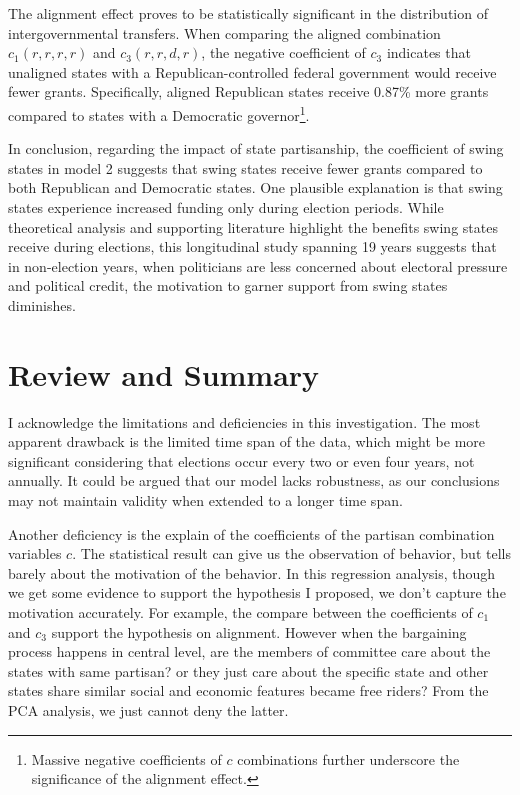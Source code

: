 \documentclass[man]{apa7}
\begin{document}

The alignment effect proves to be statistically significant in the distribution of intergovernmental transfers. When comparing the aligned combination $c_1(r, r, r, r)$ and $c_3(r, r, d, r)$, the negative coefficient of $c_3$ indicates that unaligned states with a Republican-controlled federal government would receive fewer grants. Specifically, aligned Republican states receive 0.87\% more grants compared to states with a Democratic governor\footnote{Massive negative coefficients of $c$ combinations further underscore the significance of the alignment effect.}.

In conclusion, regarding the impact of state partisanship, the coefficient of swing states in model 2 suggests that swing states receive fewer grants compared to both Republican and Democratic states. One plausible explanation is that swing states experience increased funding only during election periods. While theoretical analysis and supporting literature highlight the benefits swing states receive during elections, this longitudinal study spanning 19 years suggests that in non-election years, when politicians are less concerned about electoral pressure and political credit, the motivation to garner support from swing states diminishes.

\section{Review and Summary}

I acknowledge the limitations and deficiencies in this investigation. The most apparent drawback is the limited time span of the data, which might be more significant considering that elections occur every two or even four years, not annually. It could be argued that our model lacks robustness, as our conclusions may not maintain validity when extended to a longer time span.

Another deficiency is the explain of the coefficients of the partisan combination variables $c$. The statistical result can give us the observation of behavior, but tells barely about the motivation of the behavior. In this regression analysis, though we get some evidence to support the hypothesis I proposed, we don't capture the motivation accurately. For example, the compare between the coefficients of $c_1$ and $c_3$ support the hypothesis on alignment. However when the bargaining process happens in central level, are the members of committee care about the states with same partisan? or they just care about the specific state and other states share similar social and economic features became free riders? From the PCA analysis, we just cannot deny the latter.
\end{document}
